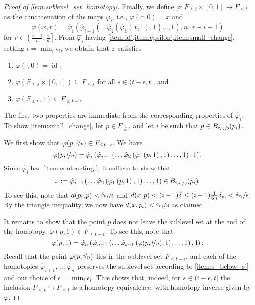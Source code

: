 \begin{proof}[Proof of \cref{lem:sublevel_set_homotopy}]
	
	Finally, we define $\varphi \colon F_{\leq t} \times [0,1] \to F_{\leq t}$ as the concatenation of the maps $\hat{\varphi}_{i}$, i.e., $\varphi(x,0) = x$ and
	\[\varphi(x,r) = \hat{\varphi}_{i} \left( \hat{\varphi}_{i-1} \left( \dots \hat{\varphi}_{2} \left( \hat{\varphi}_{1} \left( x, 1 \right), 1 \right) \dots, 1 \right), n \cdot r - i + 1\right)\] for $r \in \left( \frac{i-1}{n}, \frac{i}{n} \right]$.
	From $\hat{\varphi}_{i}$ having \cref{item:id',item:epsilon',item:small_change}, setting $\epsilon = \min_{i} \epsilon_{i}$, we obtain that $\varphi$ satisfies
	\begin{enumerate}[label={(\arabic*'')}]
		\item $\varphi(\cdot, 0) = \operatorname{id}$,
		\item $\varphi(F_{\leq s} \times [0,1]) \subseteq F_{\leq s}$ for all $s \in (t - \epsilon, t]$, and
		\item $\varphi(F_{\leq t}, 1) \subseteq F_{\leq t - \epsilon}$.
	\end{enumerate}
	The first two properties are immediate from the corresponding properties of $\hat{\varphi}_{i}$.
	To show \cref{item:small_change}, 
	let $p \in F_{\leq t}$ and let $i$ be such that 
	$p \in B_{\nicefrac{\delta_{p_{i}}}{6}}(p_{i})$.
	
	We first show that $\varphi(p, \nicefrac i n) \in F_{\leq t - \epsilon}$.
	We have 
	\[
	\varphi(p, \nicefrac i n) = \hat{\varphi}_{i} \left( \hat{\varphi}_{i-1} \left( \dots \hat{\varphi}_{2} \left( \hat{\varphi}_{1} \left( p, 1 \right), 1 \right) \dots, 1 \right), 1\right).\]
	Since $\hat{\varphi}_{i}$ has \cref{item:contracting'}, it suffices to show that \[x:=\hat{\varphi}_{i-1} \left( \dots \hat{\varphi}_{2} \left( \hat{\varphi}_{1} \left( p, 1 \right), 1 \right) \dots, 1 \right) \in B_{\nicefrac{\delta_{p_{i}}}{3}}(p_{i}).\]
	To see this, note that $d(p_i, p) < \nicefrac{\delta_{p_{i}}}{6}$ and $d(x,p) < (i-1)\hat{\delta} \leq (i-1) \frac 1 {6n} \delta_{p_{i}} < \nicefrac{\delta_{p_{i}}}{6}$.
	By the triangle inequality, we now have $d(x, p_i) < \nicefrac{\delta_{p_{i}}}{3}$ as claimed.
	
	It remains to show that the point $p$ does not leave the sublevel set at the end of the homotopy, $\varphi(p, 1) \in F_{\leq t - \epsilon}$.
	To see this, note that			
		\[
	\varphi(p, 1) = 
	\hat{\varphi}_{n} \left( \hat{\varphi}_{n-1} \left( \dots
	\hat{\varphi}_{i+1} \left(
	\varphi(p, \nicefrac i n) , 1 \right)\dots, 1\right), 1 \right).\]
	Recall that the point $\varphi(p, \nicefrac i n)$ lies in the sublevel set $F_{\leq t - \epsilon}$, and each of the homotopies $\hat{\varphi}_{i+1}, \dots, \hat{\varphi}_n$ preserves the sublevel set according to \cref{item:s_below_s'} and our choice of $\epsilon = \min_{i} \epsilon_{i}$.
	This shows that, indeed, for $s \in (t - \epsilon, t]$ the inclusion $F_{\leq s} \hookrightarrow F_{\leq t}$ is a homotopy equivalence, with homotopy inverse given by $\varphi$.
\end{proof}
